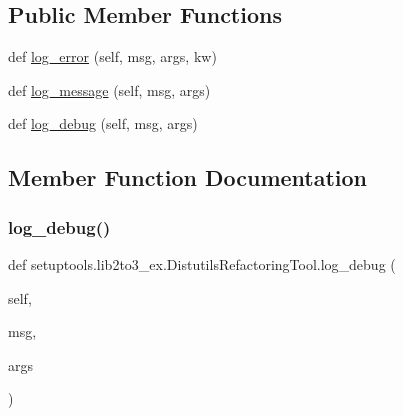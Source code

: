 \subsection*{Public Member Functions}
\begin{DoxyCompactItemize}
\item 
def \hyperlink{classsetuptools_1_1lib2to3__ex_1_1DistutilsRefactoringTool_afab7dd5ab0853f37be028101f5615e63}{log\+\_\+error} (self, msg, args, kw)
\item 
def \hyperlink{classsetuptools_1_1lib2to3__ex_1_1DistutilsRefactoringTool_abd4e41a1094e843d498e86b9a48e4872}{log\+\_\+message} (self, msg, args)
\item 
def \hyperlink{classsetuptools_1_1lib2to3__ex_1_1DistutilsRefactoringTool_a64caed9a054319ad50eff6a7eaec85fd}{log\+\_\+debug} (self, msg, args)
\end{DoxyCompactItemize}


\subsection{Member Function Documentation}
\mbox{\label{classsetuptools_1_1lib2to3__ex_1_1DistutilsRefactoringTool_a64caed9a054319ad50eff6a7eaec85fd}} 
\subsubsection{\texorpdfstring{log\+\_\+debug()}{log\_debug()}}
{\footnotesize\ttfamily def setuptools.\+lib2to3\+\_\+ex.\+Distutils\+Refactoring\+Tool.\+log\+\_\+debug (\begin{DoxyParamCaption}\item[{}]{self,  }\item[{}]{msg,  }\item[{}]{args }\end{DoxyParamCaption})}

\mbox{\label{classsetuptools_1_1lib2to3__ex_1_1DistutilsRefactoringTool_afab7dd5ab0853f37be028101f5615e63}} 
